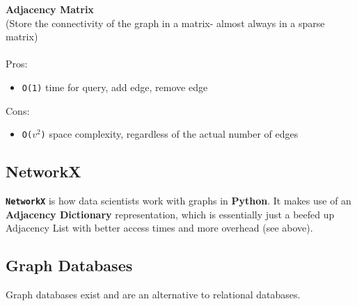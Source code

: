 \documentclass[english, 10pt]{article}
\begin{document}
\begin{myproof}
\textbf{Adjacency Matrix}\\
(Store the connectivity of the graph in a matrix- almost always in a sparse matrix)\\\\
Pros:
\begin{itemize}
	\item \texttt{O(1)} time for query, add edge, remove edge
\end{itemize}
Cons:
\begin{itemize}
	\item \texttt{O($v^2$)} space complexity, regardless of the actual number of edges
\end{itemize}
\end{myproof}

\subsection{NetworkX}

\texttt{\textbf{NetworkX}} is how data scientists work with graphs in \textbf{Python}. It makes use of an \textbf{Adjacency Dictionary} representation, which is essentially just a beefed up Adjacency List with better access times and more overhead (see above).

\subsection{Graph Databases}

Graph databases exist and are an alternative to relational databases.\\
\end{document}
